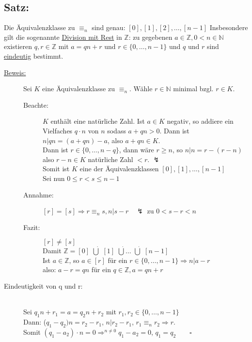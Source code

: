 \subsection{Satz:} 
Die Äquivalenzklasse zu $\equiv_{n}$ sind genau: $[0], [1], [2], \dotsc  , [n-1]$ Insbesondere gilt die sogenannte \underline{Division mit Rest} in $\mathbb{Z}$: zu gegebenen $a \in \mathbb{Z}, 0 < n \in \mathbb{N}$ existieren $q, r \in \mathbb{Z}$ mit $ a= qn+r$ und $r \in \{0,\dotsc  , n-1\}$ und $q$ und $r$ sind \underline{eindeutig} bestimmt.

\begin{description}
	\item[\underline{Beweis:}] Sei $K$ eine Äquivalenzklasse zu $\equiv_{n}$. Wähle $r \in \mathbb{N}$ minimal bzgl. $r \in 
					K$. 
	\begin{description}
		\item[Beachte:] $K$ enthält eine natürliche Zahl. Ist $ a\in K$ negativ, so addiere ein Vielfaches $q\cdot n$ von $n$ 
					sodass $a+qn > 0$. Dann ist $n|qn=(a+qn)-a$, also $a+qn \in K$. \\
					Dann ist $r \in \{0,\dotsc  , n-q\}$, dann wäre $r \geq n$, so $n|n=r-(r-n)$ also $r-n\in K$ 
					 natürliche Zahl $< r$. $\lightning$\\
					Somit ist $K$ eine der Äquivalenzklassen $[0], [1], \dotsc  , [n-1]$\\
					Sei nun $0 \leq r < s \leq n-1$
		\item[Annahme:] $[r] = [s] \Rightarrow r\equiv_{n} s, n| s-r \quad \lightning$ zu $0 < s-r < n$
		\item[Fazit:] $[r] \neq [s]$ \\
				Damit $\mathbb{Z} = [0]$ $\dot{\bigcup}$ $[1]$ $\dot{\bigcup} \dotsc   $ $\dot{\bigcup}$ $[n-1]$ \\
				Ist $ a \in \mathbb{Z}$, so $a \in [r]$ für ein $r \in \{ 0, \dotsc  , n-1\} \Rightarrow n|a-r$ \\
				also: $a-r=qn$ für ein $q \in \mathbb{Z}, a =qn+r$
	\end{description}
	\item[Eindeutigkeit von q und r:] \qquad\\
						Sei $q_{1}n+r_{1}=a=q_{2}n+r_{2}$ mit $r_{1}, r_{2} \in \{0, \dotsc  , n-1\}$ \\
						Dann: ($q_{1}-q_{2})n=r_{2}-r_{1}$, $n|r_{2}-r_{1}$, $r_{1}\equiv_{n} r_{2} 
						\Rightarrow r$.\\
						Somit $(q_{1} -a_{2}) \cdot n = 0 \Rightarrow^{n\neq 0} q_{1}-a_{2} = 0$, $q_{1} 
						= q_{2} \qquad \square$\\
\end{description}
%
%
%
